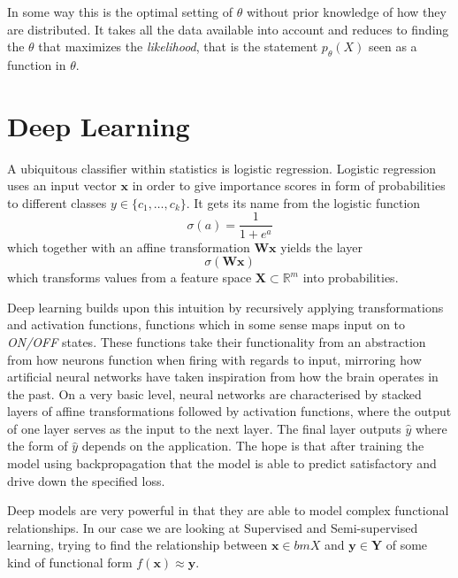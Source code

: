 In some way this is the optimal setting of $\theta$ without prior knowledge of
how they are distributed. It takes all the data available into account and
reduces to finding the $\theta$ that maximizes the \textit{likelihood}, that is
the statement $p_{\theta}(X)$ seen as a function in $\theta$.

\section{Deep Learning}
A ubiquitous classifier within statistics is logistic regression. Logistic
regression uses an input vector $\bm{x}$ in order to give importance scores in
form of probabilities to different classes $y \in \{c_1, \dots, c_k\}$. It gets
its name from the logistic function
\begin{equation}
  \label{eq:logistic_function}
  \sigma(a) = \frac{1}{1 + e^{a}}
\end{equation}
which together with an affine transformation $\bm{W} \bm{x}$ yields the layer
\begin{equation*}
  \sigma(\bm{W} \bm{x})
\end{equation*}
which transforms values from a feature space $\bm{X} \subset \mathbb{R}^m$ into
probabilities\cite{Bishop:2006}.

Deep learning builds upon this intuition by recursively applying transformations
and activation functions, functions which in some sense maps input on to
\textit{ON/OFF} states. These functions take their functionality from an
abstraction from how neurons function when firing with regards to input,
mirroring how artificial neural networks have taken inspiration from how the
brain operates in the past. On a very basic level, neural networks are
characterised by stacked layers of affine transformations followed by activation
functions, where the output of one layer serves as the input to the next layer.
The final layer outputs $\hat{y}$ where the form of $\hat{y}$ depends on the application.
The hope is that after training the model using
backpropagation\cite{Rumelhart:1995:BBT:201784.201785} that the model is able to
predict satisfactory and drive down the specified loss.

Deep models are very powerful in that they are able to model complex functional
relationships. In our case we are looking at Supervised and Semi-supervised
learning, trying to find the relationship between $\bm{x} \in bm{X}$ and $\bm{y}
\in \bm{Y}$ of some kind of functional form $f(\bm{x}) \approx \bm{y}$.

